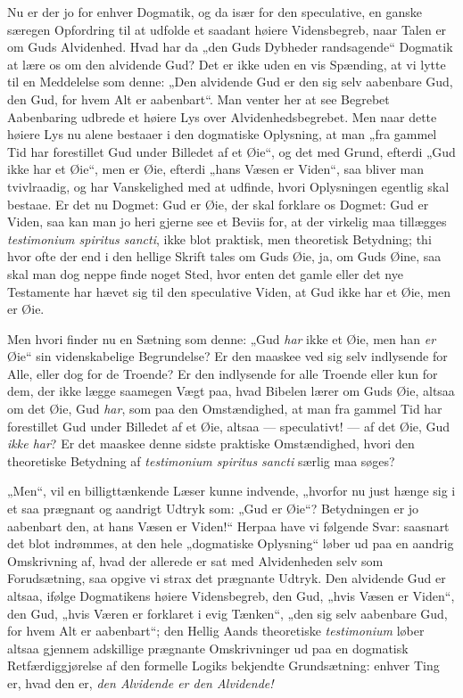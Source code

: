 \documentclass[11pt]{book}
\newcommand{\opage}[1]{\marginnote{\footnotesize\textit{[#1]}}}
\begin{document}
Nu er der jo for enhver Dogmatik, og da især for den speculative, en
ganske særegen Opfordring til at udfolde et saadant høiere
Vidensbegreb, naar Talen er om Guds Alvidenhed. Hvad har da „den
Guds Dybheder randsagende“ Dogmatik at lære os om den alvidende Gud?
Det er ikke uden en vis Spænding, at vi lytte til en Meddelelse som
denne: „Den alvidende Gud er den sig selv aabenbare Gud, den Gud,
for hvem Alt er aabenbart“. Man venter her at see Begrebet
Aabenbaring udbrede et høiere Lys over Alvidenhedsbegrebet. Men naar
dette høiere Lys nu alene bestaaer i den dogmatiske Oplysning, at
man „fra gammel Tid har forestillet Gud under Billedet af et Øie“,
og det med Grund, efterdi „Gud ikke har et Øie“, men er Øie, efterdi
„hans Væsen er Viden“, saa bliver man tvivlraadig, og har
Vanskelighed med at udfinde, hvori Oplysningen egentlig skal
bestaae. Er det nu Dogmet: Gud er Øie, der skal
\opage{50} \setcounter{footnote}{0}%
forklare os Dogmet: Gud er Viden, saa kan man jo heri gjerne see et
Beviis for, at der virkelig maa tillægges \textit{testimonium
spiritus sancti}, ikke blot praktisk, men theoretisk Betydning; thi
hvor ofte der end i den hellige Skrift tales om Guds Øie, ja, om
Guds Øine, saa skal man dog neppe finde noget Sted, hvor enten det
gamle eller det nye Testamente har hævet sig til den speculative
Viden, at Gud ikke har et Øie, men er Øie.

Men hvori finder nu en Sætning som denne: „Gud \emph{har} ikke et
Øie, men han \emph{er} Øie“ sin videnskabelige Begrundelse? Er den
maaskee ved sig selv indlysende for Alle, eller dog for de Troende?
Er den indlysende for alle Troende eller kun for dem, der ikke lægge
saamegen Vægt paa, hvad Bibelen lærer om Guds Øie, altsaa om det
Øie, Gud \emph{har}, som paa den Omstændighed, at man fra gammel Tid
har forestillet Gud under Billedet af et Øie, altsaa ---
speculativt! --- af det Øie, Gud \emph{ikke har}? Er det maaskee
denne sidste praktiske Omstændighed, hvori den theoretiske Betydning
af \textit{testimonium spiritus sancti} særlig maa søges?

„Men“, vil en billigttænkende Læser kunne indvende, „hvorfor nu just
hænge sig i et saa prægnant og aandrigt Udtryk som: „Gud er Øie“?
Betydningen er jo aabenbart den, at hans Væsen er Viden!“ Herpaa
have vi følgende Svar: saasnart det blot indrømmes, at den hele
„dogmatiske Oplysning“ løber ud paa en aandrig Omskrivning af, hvad
der allerede er sat med Alvidenheden selv som Forudsætning, saa
opgive vi strax det prægnante Udtryk. Den alvidende Gud er altsaa,
ifølge Dogmatikens høiere Vidensbegreb, den Gud, „hvis Væsen er
Viden“, den Gud, „hvis Væren er forklaret i evig Tænken“, „den sig
selv aabenbare Gud, for hvem Alt er aabenbart“; den Hellig Aands
theoretiske \textit{testimonium} løber altsaa gjennem adskillige
prægnante Omskrivninger ud paa en dogmatisk Retfærdiggjørelse af den
formelle
\opage{51} \setcounter{footnote}{0}%
Logiks bekjendte Grundsætning: enhver Ting er, hvad den er,
\emph{den Alvidende er den Alvidende!}
\end{document}
